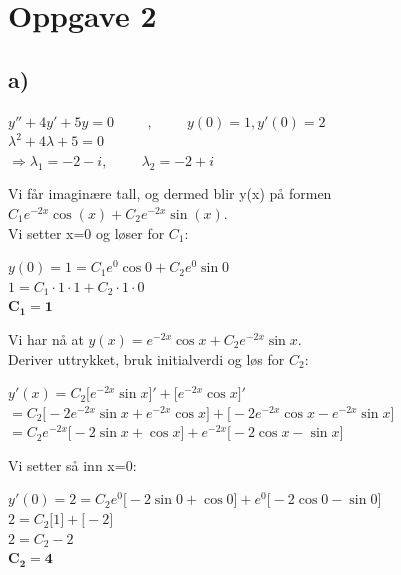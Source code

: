 \documentclass[12pt,norsk,a4paper]{article}
\begin{document}

\clearpage
\section{Oppgave 2} %
\label{sec:oppgave_2}
\subsection{a)}

\begin{center}
$y'' + 4y' + 5y = 0 \hspace{1cm} , \hspace{1cm} y(0) = 1 , y'(0) = 2$\\[1cm]
$\lambda^2 + 4\lambda + 5 = 0$ \\
$\Longrightarrow \lambda_1 = -2 -i , \hspace{1cm} \lambda_2 = -2 + i$\\
\end{center}
Vi får imaginære tall, og dermed blir y(x) på formen $C_1 e^{-2x} \cos(x) + C_2 e^{-2x} \sin(x)$.\\
Vi setter x=0 og løser for $C_1$:
\begin{center}
$y(0) = 1 = C_1 e^0 \cos0 + C_2 e^0 \sin0$\\
$1 = C_1 \cdot 1 \cdot 1 + C_2 \cdot 1 \cdot 0$\\
$\mathbf{C_1 = 1}$
\end{center}
Vi har nå at \hspace{2cm} $y(x) = e^{-2x}\cos x + C_2 e^{-2x} \sin x$.\\
Deriver uttrykket, bruk initialverdi og løs for $C_2$:
\begin{center}
$y'(x) = C_2\Bigg[e^{-2x}\sin x \Bigg]' + \Bigg[ e^{-2x} \cos x \Bigg]'$ \\
$= C_2\Bigg[-2e^{-2x}\sin x  + e^{-2x} \cos x\Bigg] + \Bigg[ -2e^{-2x} \cos x - e^{-2x}\sin x \Bigg]$ \\
$= C_2e^{-2x} \Bigg[ -2 \sin x + \cos x \Bigg] + e^{-2x} \Bigg[ -2 \cos x - \sin x\Bigg]$
\end{center}
Vi setter så inn x=0:
\begin{center}
$y'(0) = 2 = C_2 e^0 \Bigg[ -2 \sin 0 + \cos 0\Bigg] + e^0 \Bigg[ -2 \cos 0 - \sin 0 \Bigg] $\\
$ 2 = C_2 \bigg[ 1 \bigg] + \bigg[ -2 \bigg]$\\
$2 = C_2 -2 $\\
$\mathbf{C_2 = 4}$
\end{center}
\end{document}
